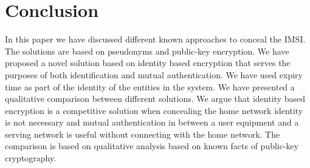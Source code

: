 \documentclass{river-journal}
\begin{document}
\section{Conclusion}
\label{sec:conclusion}In this paper we have discussed different known approaches to conceal the IMSI. The solutions  are based on pseudonyms and public-key encryption. We have proposed a novel solution based on identity based encryption that serves the purposes of both identification and mutual authentication. We have used expiry time as part of the identity of the entities in the system. We have presented a qualitative comparison between different  solutions. We argue that identity based encryption is a competitive solution when concealing the home network identity is not necessary and mutual authentication in between a user equipment and a serving network is useful without connecting with the home network. The comparison is based on qualitative analysis based on known facts of public-key cryptography.








\nocite{*} %


%
\end{document}
